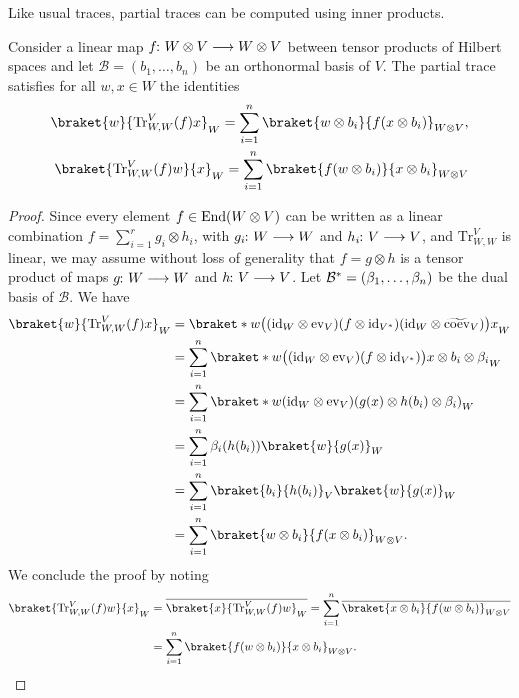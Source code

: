 \documentclass[a4paper, oneside, 12pt]{amsart}
\begin{document}
Like usual traces, partial traces can be computed using inner products.

\begin{lemma}\label{lem:how-to-compute-partial-traces}
  Consider a linear map \(f\from W\otimes V \to W \otimes V\) between tensor products of Hilbert spaces and let \(\mathcal{B} = (b_{1}, \dots , b_{n})\) be an orthonormal basis of \(V\).
  The partial trace satisfies for all  \(w,x \in W\) the identities
  \begin{subequations}
    \begin{align}
      \braket{w}{\mathrm{Tr}_{W,W}^{V}(f) x}_{W}
      = \sum_{i=1}^{n} \braket{w \otimes b_{i}}{f(x\otimes b_{i})}_{W\otimes V},\\
      \braket{\mathrm{Tr}_{W,W}^{V}(f)w}{x}_{W}
      = \sum_{i=1}^{n} \braket{f(w \otimes b_{i})}{x\otimes b_{i}}_{W\otimes V}
    \end{align}
  \end{subequations}
\end{lemma}
\begin{proof}
  Since every element \( f\in \operatorname{End}(W\otimes V)\) can be written as a linear combination \(f= \sum_{i=1}^{r} g_{i}\otimes h_{i}\), with \(g_{i} \from W \to W\) and \(h_{i} \from V\to V\), and  \(\mathrm{Tr}_{W,W}^{V}\) is linear, we may assume without loss of generality that \(f = g\otimes h\) is a tensor product of maps \(g\from W\to W\) and \(h \from V \to V\).
  Let \(\rd*{ \mathcal{B}} = (\beta_{1}, \dots , \beta_{n})\) be the dual basis of \(\mathcal{B}\).
  We have
  \begin{align*}
    \braket{w}{\mathrm{Tr}_{W,W}^{V}(f) x}_{W}
    & = \braket*{w}{\big((\id_{W} \otimes \ev_{V}) (f\otimes \id_{\rd*{V}}) (\id_{W}\otimes \widetilde{\coev}_{V})\big) x}_{W}\\
    & = \sum_{i=1}^{n} \braket*{w}{\big((\id_{W} \otimes \ev_{V}) (f\otimes \id_{\rd*{V}})\big) x\otimes b_{i} \otimes \beta_{i}}_{W} \\
    & = \sum_{i=1}^{n} \braket*{w}{(\id_{W} \otimes \ev_{V}) (g(x) \otimes h(b_{i}) \otimes \beta_{i})}_{W} \\
    & = \sum_{i=1}^{n} \beta_{i}(h(b_{i})) \braket{w}{g(x)}_{W}\\
    & = \sum_{i=1}^{n} \braket{b_{i}}{h(b_{i})}_{V} \braket{w}{g(x)}_{W} \\
    & = \sum_{i=1}^{n} \braket{w \otimes b_{i}}{f(x \otimes b_{i})}_{W\otimes V}.
  \end{align*}
  We conclude the proof by noting
  \begin{align*}
    \braket{\mathrm{Tr}_{W,W}^{V}(f)w}{x}_{W}
    & = \overline{\braket{x}{\mathrm{Tr}_{W,W}^{V}(f)w}_{W}}
      = \sum_{i=1}^{n} \overline{\braket{x \otimes b_{i}}{f(w \otimes b_{i})}_{W\otimes V}} \\
    & = \sum_{i=1}^{n} \braket{f(w \otimes b_{i})}{x \otimes b_{i}}_{W\otimes V}. \qedhere
  \end{align*}
\end{proof}
\end{document}
